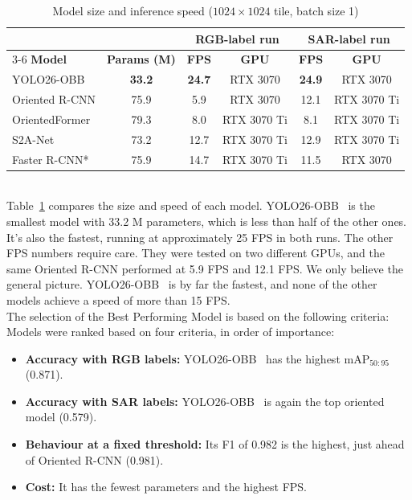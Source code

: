\begin{table}[htbp]
\centering

\begin{tabular}{|l|c|c|c|c|c|}
\hline
 & & \multicolumn{2}{c|}{\textbf{RGB-label run}} & \multicolumn{2}{c|}{\textbf{SAR-label run}} \\
\cline{3-6}
\textbf{Model} & \textbf{Params (M)} & \textbf{FPS} & \textbf{GPU} & \textbf{FPS} & \textbf{GPU} \\
\hline
YOLO26-OBB     & \textbf{33.2} & \textbf{24.7} & RTX 3070    & \textbf{24.9} & RTX 3070    \\
Oriented R-CNN & 75.9          & 5.9           & RTX 3070    & 12.1          & RTX 3070 Ti \\
OrientedFormer & 79.3          & 8.0           & RTX 3070 Ti & 8.1           & RTX 3070 Ti \\
S2A-Net        & 73.2          & 12.7          & RTX 3070 Ti & 12.9          & RTX 3070 Ti \\
Faster R-CNN*  & 75.9          & 14.7          & RTX 3070 Ti & 11.5          & RTX 3070    \\
\hline
\end{tabular}
\vspace{4pt}
\caption{Model size and inference speed ($1024 \times 1024$ tile, batch size 1)}
\label{tab:model_speed_overview}
\end{table}
\\
Table~\ref{tab:model_speed_overview} compares the size and speed of each model. YOLO26-OBB~\cite{jocher2026ultralytics} is the smallest model with 33.2 M parameters, which is less than half of the other ones. It's also the fastest, running at approximately 25 FPS in both runs. The other FPS numbers require care. They were tested on two different GPUs, and the same Oriented R-CNN\cite{xie2021oriented} performed at 5.9 FPS and 12.1 FPS. We only believe the general picture. YOLO26-OBB~\cite{jocher2026ultralytics} is by far the fastest, and none of the other models achieve a speed of more than 15 FPS.\\

The selection of the Best Performing Model is based on the following criteria:\\

Models were ranked based on four criteria, in order of importance:
\begin{itemize}
    \item \textbf{Accuracy with RGB labels:} YOLO26-OBB~\cite{jocher2026ultralytics} has the highest mAP$_{50:95}$ (0.871).
    \item \textbf{Accuracy with SAR labels:} YOLO26-OBB~\cite{jocher2026ultralytics} is again the top oriented model (0.579).
    \item \textbf{Behaviour at a fixed threshold:} Its F1 of 0.982 is the highest, just ahead of Oriented R-CNN (0.981).
    \item \textbf{Cost:} It has the fewest parameters and the highest FPS.
\end{itemize}

